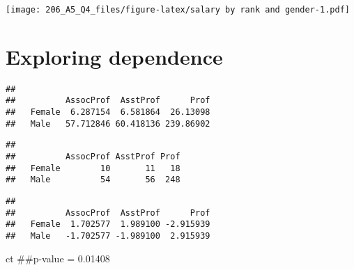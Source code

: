 \documentclass[]{article}
\newenvironment{Shaded}{\begin{snugshade}}{\end{snugshade}}
\newcommand{\KeywordTok}[1]{\textcolor[rgb]{0.13,0.29,0.53}{\textbf{#1}}}
\newcommand{\CommentTok}[1]{\textcolor[rgb]{0.56,0.35,0.01}{\textit{#1}}}
\newcommand{\OperatorTok}[1]{\textcolor[rgb]{0.81,0.36,0.00}{\textbf{#1}}}
\newcommand{\NormalTok}[1]{#1}
\begin{document}
\texttt{[image: 206\_A5\_Q4\_files/figure-latex/salary by rank and gender-1.pdf]}

\section{Exploring dependence}\label{exploring-dependence}

\begin{Shaded}
\end{Shaded}

\begin{verbatim}
##         
##          AssocProf  AsstProf      Prof
##   Female  6.287154  6.581864  26.13098
##   Male   57.712846 60.418136 239.86902
\end{verbatim}

\begin{Shaded}
\end{Shaded}

\begin{verbatim}
##         
##          AssocProf AsstProf Prof
##   Female        10       11   18
##   Male          54       56  248
\end{verbatim}

\begin{Shaded}
\end{Shaded}

\begin{verbatim}
##         
##          AssocProf  AsstProf      Prof
##   Female  1.702577  1.989100 -2.915939
##   Male   -1.702577 -1.989100  2.915939
\end{verbatim}

\begin{Shaded}
\begin{Highlighting}[]
\NormalTok{ct ##p-value = 0.01408}
\end{Highlighting}
\end{Shaded}
\end{document}
